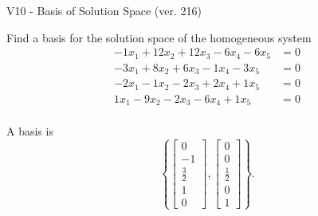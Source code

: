 \begin{exercise}
  \begin{exerciseTitle}V10 - Basis of Solution Space (ver. 216)\end{exerciseTitle}
  \begin{exerciseStatement}
    Find a basis for the solution space of the homogeneous system 
\begin{align*}
 -1 x_ 1 + 12 x_ 2 + 12 x_ 3 -6 x_ 4 -6 x_ 5 &= 0  \\ 
  -3 x_ 1 + 8 x_ 2 + 6 x_ 3 -1 x_ 4 -3 x_ 5 &= 0  \\ 
  -2 x_ 1 -1 x_ 2 -2 x_ 3 + 2 x_ 4 + 1 x_ 5 &= 0  \\ 
  1 x_ 1 -9 x_ 2 -2 x_ 3 -6 x_ 4 + 1 x_ 5 &= 0  \\ 
 \end{align*}


 
  \end{exerciseStatement}

  \begin{exerciseAnswer}
   A basis is   
\[\left\{\left[\begin{array}{c}
0 \\
-1 \\
\frac{3}{2} \\
1 \\
0
\end{array}\right] , \left[\begin{array}{c}
0 \\
0 \\
\frac{1}{2} \\
0 \\
1
\end{array}\right]\right\}.\]

  


  \end{exerciseAnswer}
\end{exercise}